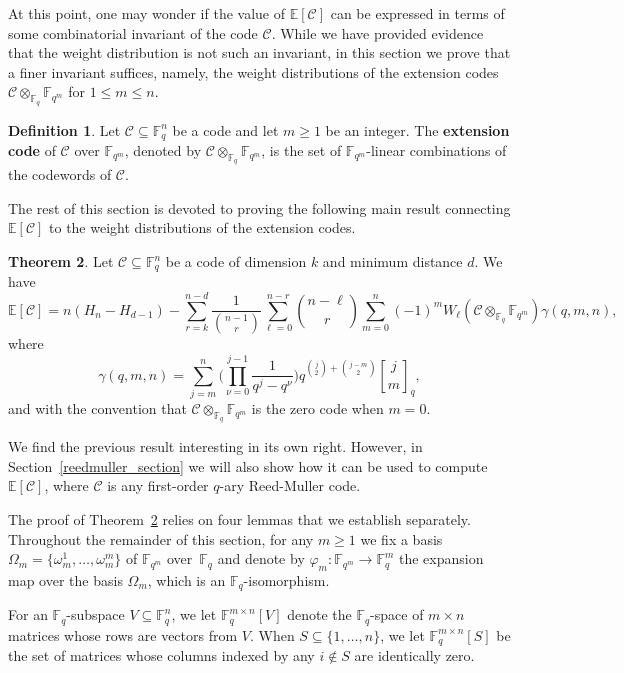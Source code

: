\documentclass[11pt,a4paper,reqno,twoside]{article}
\theoremstyle{definition}
\newtheorem{theorem}{Theorem}[section]
\newtheorem{definition}[theorem]{Definition}
\newcommand{\F}{\mathbb{F}}
\newcommand{\E}{\mathbb{E}}
\newcommand{\mC}{\mathcal{C}}
\newcommand{\qbinom}[2]{\genfrac{[}{]}{0pt}{}{#1}{#2}}
\begin{document}
At this point, one may wonder if the value of $\E[\mC]$ can be expressed in terms of some combinatorial invariant of the code $\mC$. While we have provided evidence that the weight distribution is not such an invariant, in this section we prove that a finer invariant suffices, namely, the weight distributions of the extension codes $\mC \otimes_{\F_q} \F_{q^m}$ for $1 \le m \le n$.



\begin{definition}
    Let $\mC \subseteq \F_q^n$ be a code 
    and let $m \ge 1$ be an integer. The \textbf{extension code} of $\mC$ over $\F_{q^m}$, denoted by $\mC \otimes_{\F_q} \F_{q^m}$, is the set of $\F_{q^m}$-linear combinations of the codewords of $\mC$.
\end{definition}


The rest of this section is devoted to proving the following main result connecting $\E[\mC]$ to the weight distributions of the extension codes.

\begin{theorem} \label{expectation_weight_distr}
    Let $\mC \subseteq \F_q^n$ be a code of dimension $k$ and minimum distance $d$. We have  
   \[
    \E[\mC] = n(H_n - H_{d-1}) - \sum_{r=k}^{n-d} \frac{1}{\binom{n-1}{r}} \sum_{\ell=0}^{n-r} \binom{n-\ell}{r} \sum_{m=0}^n (-1)^m W_{\ell}(\mC  \otimes_{\F_q} \F_{q^m}) \gamma(q,m,n),
\]
where 
\[
\gamma(q,m,n) = \sum_{j=m}^n \Bigg( \prod_{\nu=0}^{j-1} \frac{1}{q^j - q^\nu} \Bigg) q^{\binom{j}{2} + \binom{j-m}{2}} \qbinom{j}{m}_q, 
\]
and with the convention that $\mC  \otimes_{\F_q} \F_{q^m}$ is the zero code when $m=0$.
\end{theorem}

We find the previous result interesting in its own right. However, in Section~\ref{reedmuller_section} we will also show how it can be used to compute $\E[\mC]$, where $\mC$ is any first-order $q$-ary Reed-Muller code.

The proof of Theorem~\ref{expectation_weight_distr} relies on four lemmas that we establish separately.
Throughout the remainder of this section, for any $m \ge 1$ we fix a basis $\Omega_m=\{\omega^1_m, \ldots, \omega^m_m\}$ of $\F_{q^m}$ over~$\F_q$ and denote by $\varphi_m:\F_{q^m} \to \F_q^m$ the expansion map over the basis $\Omega_m$, which is an $\F_q$-isomorphism.

For an $\F_q$-subspace $V \subseteq \F_q^n$, we let
$\F_q^{m \times n}[V]$ denote the $\F_q$-space of $m \times n$ matrices whose rows are vectors from $V$. When $S \subseteq \{1, \ldots, n\}$, we let
$\F_q^{m \times n}[S]$ be the set of matrices whose columns indexed by any $i \notin S$ are identically zero.
\end{document}
